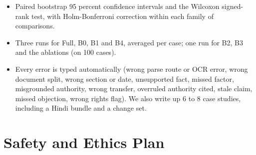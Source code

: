 \documentclass[10pt,a4paper]{article}
\begin{document}
\begin{itemize}
\item Paired bootstrap 95 percent confidence intervals and the Wilcoxon signed-rank test, with Holm-Bonferroni correction within each family of comparisons.
\item Three runs for Full, B0, B1 and B4, averaged per case; one run for B2, B3 and the ablations (on 100 cases).
\item Every error is typed automatically (wrong parse route or OCR error, wrong document split, wrong section or date, unsupported fact, missed factor, misgrounded authority, wrong transfer, overruled authority cited, stale claim, missed objection, wrong rights flag). We also write up 6 to 8 case studies, including a Hindi bundle and a change set.
\end{itemize}

\section{Safety and Ethics Plan}
\end{document}
